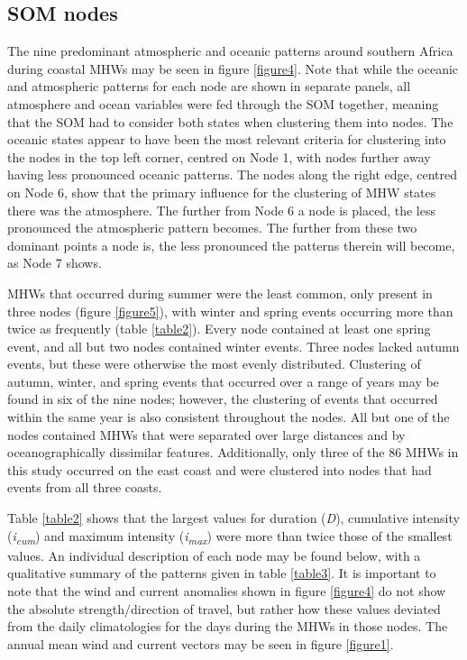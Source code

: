\documentclass[utf8]{frontiersSCNS}
\begin{document}


\subsection{SOM nodes}
The nine predominant atmospheric and oceanic patterns around southern Africa during coastal MHWs may be seen in figure \ref{figure4}. Note that while the oceanic and atmospheric patterns for each node are shown in separate panels, all atmosphere and ocean variables were fed through the SOM together, meaning that the SOM had to consider both states when clustering them into nodes. The oceanic states appear to have been the most relevant criteria for clustering into the nodes in the top left corner, centred on Node 1, with nodes further away having less pronounced oceanic patterns. The nodes along the right edge, centred on Node 6, show that the primary influence for the clustering of MHW states there was the atmosphere. The further from Node 6 a node is placed, the less pronounced the atmospheric pattern becomes. The further from these two dominant points a node is, the less pronounced the patterns therein will become, as Node 7 shows.

MHWs that occurred during summer were the least common, only present in three nodes (figure \ref{figure5}), with winter and spring events occurring more than twice as frequently (table \ref{table2}). Every node contained at least one spring event, and all but two nodes contained winter events. Three nodes lacked autumn events, but these were otherwise the most evenly distributed. Clustering of autumn, winter, and spring events that occurred over a range of years may be found in six of the nine nodes; however, the clustering of events that occurred within the same year is also consistent throughout the nodes. All but one of the nodes contained MHWs that were separated over large distances and by oceanographically dissimilar features. Additionally, only three of the 86 MHWs in this study occurred on the east coast and were clustered into nodes that had events from all three coasts.

Table \ref{table2} shows that the largest values for duration (\emph{D}), cumulative intensity (\emph{i\textsubscript{cum}}) and maximum intensity (\emph{i\textsubscript{max}}) were more than twice those of the smallest values. An individual description of each node may be found below, with a qualitative summary of the patterns given in table \ref{table3}. It is important to note that the wind and current anomalies shown in figure \ref{figure4} do not show the absolute strength/direction of travel, but rather how these values deviated from the daily climatologies for the days during the MHWs in those nodes. The annual mean wind and current vectors may be seen in figure \ref{figure1}.
\end{document}
